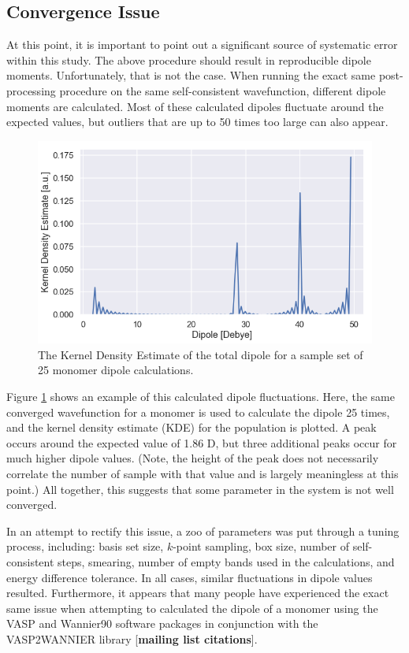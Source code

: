         \subsection{Convergence Issue} 
        \label{sec:convergence_issue}
        At this point, it is important to point out a significant source of systematic error within this study. The above procedure should result in reproducible dipole moments. Unfortunately, that is not the case. When running the exact same post-processing procedure on the same self-consistent wavefunction, different dipole moments are calculated. Most of these calculated dipoles fluctuate around the expected values, but outliers that are up to 50 times too large can also appear.
        
        \begin{figure}
            \centering
            \includegraphics[width=0.9\linewidth]{Figures/System/pc_bad_convergence.png}
            \caption{The Kernel Density Estimate of the total dipole for a sample set of 25 monomer dipole calculations.}
            \label{fig:pc_bad_convergence}
        \end{figure}
        
        Figure \ref{fig:pc_bad_convergence} shows an example of this calculated dipole fluctuations. Here, the same converged wavefunction for a monomer is used to calculate the dipole 25 times, and the kernel density estimate (KDE) for the population is plotted. A peak occurs around the expected value of 1.86 D, but three additional peaks occur for much higher dipole values. (Note, the height of the peak does not necessarily correlate the number of sample with that value and is largely meaningless at this point.) All together, this suggests that some parameter in the system is not well converged.
        
        In an attempt to rectify this issue, a zoo of parameters was put through a tuning process, including: basis set size, $k$-point sampling, box size, number of self-consistent steps, smearing, number of empty bands used in the calculations, and energy difference tolerance. In all cases, similar fluctuations in dipole values resulted. Furthermore, it appears that many people have experienced the exact same issue when attempting to calculated the dipole of a monomer using the VASP and Wannier90 software packages in conjunction with the VASP2WANNIER library [\textbf{mailing list citations}]. 
        
